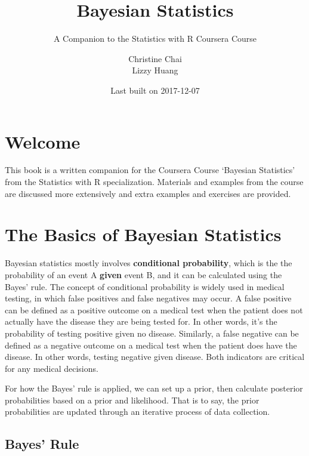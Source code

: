 \documentclass[]{book}
\title{Bayesian Statistics}
\subtitle{A Companion to the Statistics with R Coursera Course}
\author{Christine Chai \\ Lizzy Huang}
\date{Last built on 2017-12-07}
\theoremstyle{definition}
\theoremstyle{definition}
\theoremstyle{definition}
\theoremstyle{remark}
\begin{document}
\maketitle

{
\setcounter{tocdepth}{1}
\tableofcontents
}
\chapter*{Welcome}\label{welcome}

\newcommand{\No}{\textsf{N}}
\newcommand{\Ga}{\textsf{Gamma}}
\newcommand{\St}{\textsf{t}}
\newcommand{\NoGa}{\textsf{NormalGamma}}
\newcommand{\BF}{\textsf{BF}}
\newcommand{\data}{\text{data}}
\newcommand{\iid}{\mathrel{\mathop{\sim}\limits^{\rm iid}}}
\newcommand{\Ca}{\textsf{C}}



This book is a written companion for the Coursera Course `Bayesian
Statistics' from the Statistics with R specialization. Materials and
examples from the course are discussed more extensively and extra
examples and exercises are provided.

\chapter{The Basics of Bayesian
Statistics}\label{the-basics-of-bayesian-statistics}

Bayesian statistics mostly involves \textbf{conditional probability},
which is the the probability of an event A \textbf{given} event B, and
it can be calculated using the Bayes' rule. The concept of conditional
probability is widely used in medical testing, in which false positives
and false negatives may occur. A false positive can be defined as a
positive outcome on a medical test when the patient does not actually
have the disease they are being tested for. In other words, it's the
probability of testing positive given no disease. Similarly, a false
negative can be defined as a negative outcome on a medical test when the
patient does have the disease. In other words, testing negative given
disease. Both indicators are critical for any medical decisions.

For how the Bayes' rule is applied, we can set up a prior, then
calculate posterior probabilities based on a prior and likelihood. That
is to say, the prior probabilities are updated through an iterative
process of data collection.

\section{Bayes' Rule}\label{bayes-rule}
\end{document}
